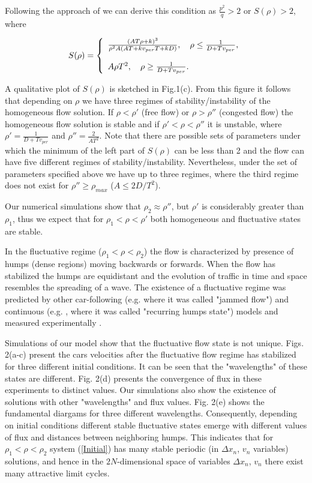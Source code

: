 Following the approach of \cite{Sug} we can derive this condition as
$\frac{p^2}{q}>2$ or $S(\rho)>2$, where

\begin{equation}
S(\rho)=
\left\{
\begin{array}{l}
\frac{(AT\rho+k)^3}{\rho^2A(AT+kv_{per}T+kD)},\quad\rho\leq\frac{1}{D+Tv_{per}},\cr 
\cr 
A\rho T^2,\quad
\rho\geq\frac{1}{D+Tv_{per}}. \end{array}
\right.
\end{equation}

A qualitative plot
of $S(\rho)$ is sketched in Fig.1(c). From this figure it follows that
depending on $\rho$ we have three regimes of
stability/instability of the homogeneous flow solution. If $\rho<\rho'$ (free
flow) or $\rho>\rho''$ (congested flow) the homogeneous flow solution is stable
and if $\rho'<\rho<\rho''$ it is unstable, where $\rho'=\frac{1}{D+Tv_{per}}$
and $\rho''=\frac{2}{AT^2}$. Note that there are possible sets of parameters
under which the minimum of the left part of $S(\rho)$ can be less than 2 and
the flow can have five different regimes of stability/instability.
Nevertheless, under the set of parameters specified above we have up to three
regimes, where the third regime does not exist for $\rho''\geq \rho_{max}$
($A\leq 2D/T^2$).

Our numerical simulations show that $\rho_2\approx \rho''$, but $\rho'$ is
considerably greater than $\rho_1$, thus we expect that for
$\rho_1<\rho<\rho'$ both homogeneous and fluctuative states are stable.

In the fluctuative regime ($\rho_1<\rho<\rho_2$) the flow is
characterized by presence of humps (dense regions) moving backwards
or forwards. When the flow has stabilized the humps are equidistant and the evolution of
traffic in time and space resembles the spreading of a wave. The existence of a
fluctuative regime was predicted by other car-following (e.g. \cite{Sug} where
it was called "jammed flow") and continuous (e.g. \cite{LLK}, where it was
called "recurring humps state") models and measured experimentally \cite{KR1}.

Simulations of our model
show that the fluctuative flow state is not unique.
Figs. 2(a-c) present the
cars velocities after the fluctuative flow regime has stabilized for three
different initial conditions. It can be seen
that the "wavelengths" of these states are different. Fig. 2(d) presents the
convergence of flux in these experiments to distinct values. Our
simulations also show the existence of solutions with other "wavelengths" and
flux values. Fig. 2(e) shows the fundamental diargams for three different
wavelengths. Consequently, depending on initial conditions different stable
fluctuative states emerge with different values of flux and
distances between neighboring humps. This indicates that for
$\rho_1<\rho<\rho_2$ system (\ref{Initial}) has many stable periodic (in
$\Delta x_n$, $v_n$ variables) solutions, and hence in the $2N$-dimensional
space of variables $\Delta x_n$, $v_n$ there exist many attractive limit
cycles.

